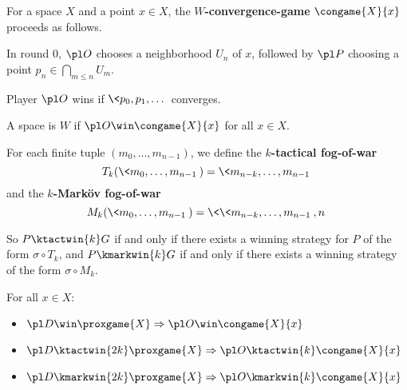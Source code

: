 \begin{defn}
  For a space $X$ and a point $x\in X$, the \textbf{$W$-convergence-game} $\congame{X}{x}$ proceeds as follows. 

  In round $0$, $\pl O$ chooses a neighborhood $U_n$ of $x$, followed by $\pl P$ choosing a point $p_n\in \bigcap_{m\leq n}U_m$.

  Player $\pl O$ wins if $\<p_0,p_1,\dots\>$ converges.
\end{defn}

\begin{defn}
  A space is \textbf{$W$} if $\pl O \win \congame{X}{x}$ for all $x\in X$.
\end{defn}

\begin{defn}
  For each finite tuple $(m_0,\dots,m_{n-1})$, we define the \textbf{$k$-tactical fog-of-war}
    \[
      T_k(\<m_0,\dots,m_{n-1}\>)=\<m_{n-k},\dots,m_{n-1}\>
    \]
  and the \textbf{$k$-Mark\"ov fog-of-war}
    \[
      M_k(\<m_0,\dots,m_{n-1}\>)=\<\<m_{n-k},\dots,m_{n-1}\>,n\>
    \]

  So $P\ktactwin{k}G$ if and only if there exists a winning strategy for $P$ of the form $\sigma\circ T_k$, and $P\kmarkwin{k}G$ if and only if there exists a winning strategy of the form $\sigma\circ M_k$.
\end{defn}

\begin{thm}
For all $x\in X$:
  \begin{itemize}
    \item
      $\pl D\win \proxgame{X} \Rightarrow \pl O \win \congame{X}{x}$
    \item
      $\pl D\ktactwin{2k} \proxgame{X} \Rightarrow \pl O \ktactwin{k} \congame{X}{x}$
    \item
      $\pl D\kmarkwin{2k} \proxgame{X} \Rightarrow \pl O \kmarkwin{k} \congame{X}{x}$
  \end{itemize}
\end{thm}

